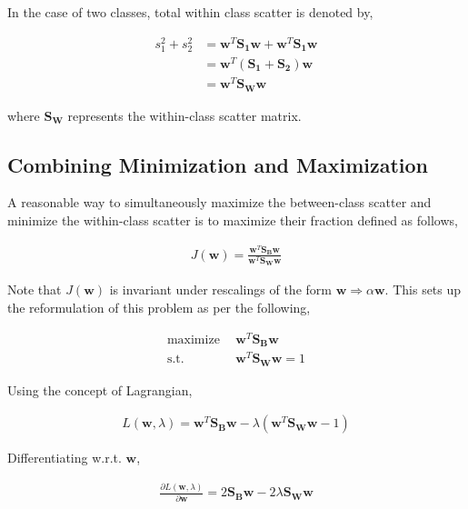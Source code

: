 \documentclass[11pt, a4paper]{article}
\begin{document}
In the case of two classes, total within class scatter is denoted by,

\begin{align*}
	s_1^2 + s_2^2 & = \boldsymbol{w}^T \boldsymbol{S_1} \boldsymbol{w} + \boldsymbol{w}^T \boldsymbol{S_1} \boldsymbol{w} \\
	              & = \boldsymbol{w}^T (\boldsymbol{S_1}+\boldsymbol{S_2}) \boldsymbol{w}                                 \\
	              & = \boldsymbol{w}^T \boldsymbol{S_W} \boldsymbol{w}                                                    
\end{align*}

where $\boldsymbol{S_W}$ represents the within-class scatter matrix.

\subsection{Combining Minimization and Maximization}

A reasonable way to simultaneously maximize the between-class scatter and minimize the within-class scatter is to maximize their fraction defined as follows,

\begin{align*}
	J(\boldsymbol{w}) = \frac{\boldsymbol{w}^T \boldsymbol{S_B} \boldsymbol{w}}{\boldsymbol{w}^T \boldsymbol{S_W} \boldsymbol{w}} 
\end{align*}

Note that $J(\boldsymbol{w})$ is invariant under rescalings of the form $\boldsymbol{w} \Rightarrow \alpha \boldsymbol{w}$. This sets up the reformulation of this problem as per the following,

\begin{align*}
	\text{maximize} & \ \ \boldsymbol{w}^T \boldsymbol{S_B} \boldsymbol{w}     \\
	\text{s.t.}     & \ \ \boldsymbol{w}^T \boldsymbol{S_W} \boldsymbol{w} = 1 
\end{align*}

Using the concept of Lagrangian, 

\begin{align*}
	L(\boldsymbol{w}, \lambda) = \boldsymbol{w}^T \boldsymbol{S_B} \boldsymbol{w} - \lambda(\boldsymbol{w}^T \boldsymbol{S_W} \boldsymbol{w} - 1) 
\end{align*}

Differentiating w.r.t. $\boldsymbol{w}$,

\begin{align*}
	\frac{\partial L(\boldsymbol{w}, \lambda)}{\partial \boldsymbol{w}} = 2\boldsymbol{S_B}\boldsymbol{w} - 2\lambda \boldsymbol{S_W}\boldsymbol{w} 
\end{align*}
\end{document}
